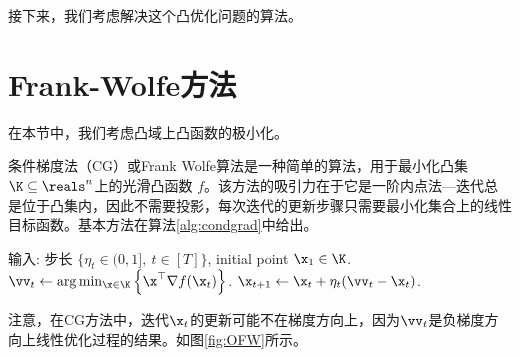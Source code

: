 接下来，我们考虑解决这个凸优化问题的算法。

\section{
    Frank-Wolfe方法
    } 

在本节中，我们考虑凸域上凸函数的极小化。

条件梯度法（CG）或Frank Wolfe算法是一种简单的算法，用于最小化凸集 $\K \subseteq \reals^n$上的光滑凸函数 $f$。该方法的吸引力在于它是一阶内点法---迭代总是位于凸集内，因此不需要投影，每次迭代的更新步骤只需要最小化集合上的线性目标函数。基本方法在算法\ref{alg:condgrad}中给出。
\begin{algorithm}[H]
	\caption{
        条件梯度
        }
	\label{alg:condgrad}
	\begin{algorithmic}[1]
		\STATE 输入: 步长 $\{ \eta_t \in (0,1] , \ t \in [T]\}$, initial point $\x_1 \in \K$. 
		\STATE $\vv_{t} \gets \arg \min_{\x \in \K} \left\{\x^\top \nabla{}f(\x_t) \right\} $. \label{algstep:linearopt}
		\STATE $\x_{t+1} \gets \x_t + \eta_t(\vv_t - \x_t)$.
		\ENDFOR
	\end{algorithmic}
\end{algorithm}

注意，在CG方法中，迭代$\x_t$的更新可能不在梯度方向上，因为$\vv_t$是负梯度方向上线性优化过程的结果。如图\ref{fig:OFW}所示。

